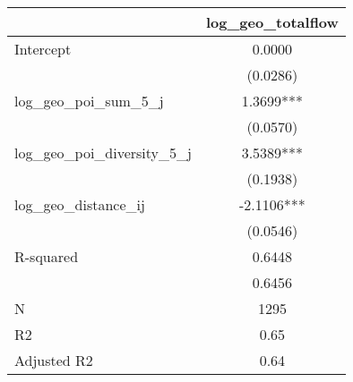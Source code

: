 \begin{table}
\caption{}
\begin{center}
\begin{tabular}{lc}
\hline
                               & log\_geo\_totalflow  \\
\midrule
Intercept                      & 0.0000               \\
                               & (0.0286)             \\
log\_geo\_poi\_sum\_5\_j       & 1.3699***            \\
                               & (0.0570)             \\
log\_geo\_poi\_diversity\_5\_j & 3.5389***            \\
                               & (0.1938)             \\
log\_geo\_distance\_ij         & -2.1106***           \\
                               & (0.0546)             \\
R-squared                      & 0.6448               \\
                               & 0.6456               \\
N                              & 1295                 \\
R2                             & 0.65                 \\
Adjusted R2                    & 0.64                 \\
\hline
\end{tabular}
\end{center}
\end{table}